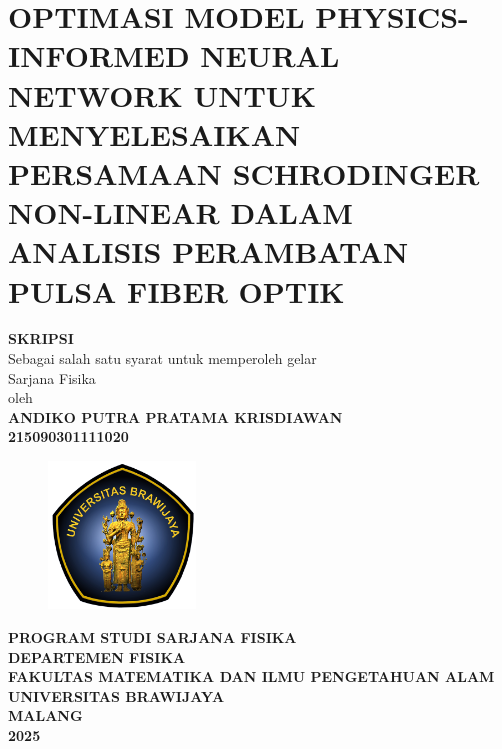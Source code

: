 
\chapter*{OPTIMASI MODEL PHYSICS-INFORMED NEURAL
NETWORK UNTUK MENYELESAIKAN PERSAMAAN
SCHRODINGER NON-LINEAR DALAM ANALISIS
PERAMBATAN PULSA FIBER OPTIK}
\begin{center}
	\vspace{1.0cm}
	{\textbf{SKRIPSI{\huge}}}\\
	\vspace{0.5cm}
	Sebagai salah satu syarat untuk memperoleh gelar\\Sarjana Fisika\\
	\vspace{0.5cm}
	oleh\\
	\textbf{ANDIKO PUTRA PRATAMA KRISDIAWAN}\\
	\textbf{215090301111020}\\
	
	\vspace{1.5cm}
	\begin{figure}[h]
		\centering
		\includegraphics[width=0.35\textwidth]{Gambar/LogoUB.png}
	\end{figure}
	
	\vfill
	{\textbf{PROGRAM STUDI SARJANA FISIKA}}\\
	{\textbf{DEPARTEMEN FISIKA}}\\
	{\fontsize{10.5pt}{0.ex} \textbf{FAKULTAS MATEMATIKA DAN ILMU PENGETAHUAN ALAM}}\\
	{\textbf{UNIVERSITAS BRAWIJAYA}}\\
	{\textbf{MALANG}}\\
	{\textbf{2025}}\\
\end{center}
\cleardoublepage

